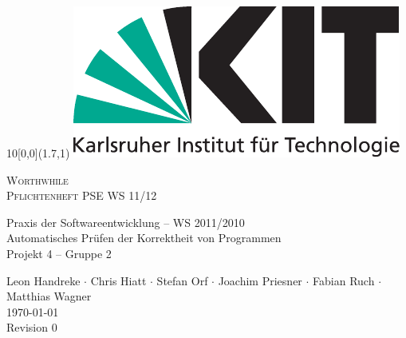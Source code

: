 
\newcommand{\diameter}{20}
\newcommand{\xone}{-30}
\newcommand{\xtwo}{150}
\newcommand{\yone}{15}
\newcommand{\ytwo}{-265}

\begin{titlepage}

	\begin{textblock}{10}[0,0](1.7,1)
		\includegraphics[width=.3\textwidth]{images/kit_logo_de_4c_positiv.pdf}
	\end{textblock}
	\begin{center}
		\fontsize{45}{50}\selectfont
        \vfill
        \textsc{Worthwhile} \\
        \textsc{Pflichtenheft}
        \vfill
		\LARGE
		PSE WS 11/12
  \vfill
 \newpage
 
 \null
 \vfill
 
 Praxis der Softwareentwicklung -- WS 2011/2010 \\
 
  \Large
  Automatisches Prüfen der Korrektheit von Programmen \\
  Projekt 4 -- Gruppe 2 \\
  \medskip
  \vspace{2cm}
  
    Leon Handreke $\cdot$ Chris Hiatt $\cdot$ Stefan Orf $\cdot$ Joachim Priesner $\cdot$ Fabian Ruch $\cdot$ Matthias Wagner
  \vspace{2cm} \\
  \today \\
	Revision 0
	\end{center}
	
  \vfill

\end{titlepage}
